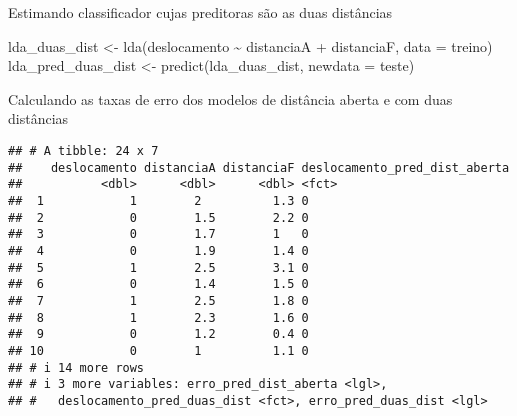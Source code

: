 \documentclass[
]{article}
\newenvironment{Shaded}{\begin{snugshade}}{\end{snugshade}}
\newcommand{\AttributeTok}[1]{\textcolor[rgb]{0.77,0.63,0.00}{#1}}
\newcommand{\FunctionTok}[1]{\textcolor[rgb]{0.00,0.00,0.00}{#1}}
\newcommand{\NormalTok}[1]{#1}
\newcommand{\OtherTok}[1]{\textcolor[rgb]{0.56,0.35,0.01}{#1}}
\newcommand{\SpecialCharTok}[1]{\textcolor[rgb]{0.00,0.00,0.00}{#1}}
\begin{document}
Estimando classificador cujas preditoras são as duas distâncias

\begin{Shaded}
\begin{Highlighting}[]
\NormalTok{lda\_duas\_dist }\OtherTok{\textless{}{-}} \FunctionTok{lda}\NormalTok{(deslocamento }\SpecialCharTok{\textasciitilde{}}\NormalTok{ distanciaA }\SpecialCharTok{+}\NormalTok{ distanciaF, }\AttributeTok{data =}\NormalTok{ treino)}
\NormalTok{lda\_pred\_duas\_dist }\OtherTok{\textless{}{-}}  \FunctionTok{predict}\NormalTok{(lda\_duas\_dist, }\AttributeTok{newdata =}\NormalTok{ teste)}
\end{Highlighting}
\end{Shaded}

Calculando as taxas de erro dos modelos de distância aberta e com duas
distâncias

\begin{Shaded}
\end{Shaded}

\begin{verbatim}
## # A tibble: 24 x 7
##    deslocamento distanciaA distanciaF deslocamento_pred_dist_aberta
##           <dbl>      <dbl>      <dbl> <fct>                        
##  1            1        2          1.3 0                            
##  2            0        1.5        2.2 0                            
##  3            0        1.7        1   0                            
##  4            0        1.9        1.4 0                            
##  5            1        2.5        3.1 0                            
##  6            0        1.4        1.5 0                            
##  7            1        2.5        1.8 0                            
##  8            1        2.3        1.6 0                            
##  9            0        1.2        0.4 0                            
## 10            0        1          1.1 0                            
## # i 14 more rows
## # i 3 more variables: erro_pred_dist_aberta <lgl>,
## #   deslocamento_pred_duas_dist <fct>, erro_pred_duas_dist <lgl>
\end{verbatim}
\end{document}

